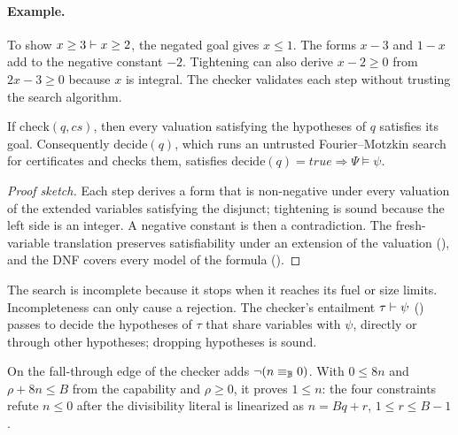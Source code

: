\paragraph{Example.} To show $x\ge3\vdash x\ge2$, the negated goal gives $x\le1$. The forms $x-3$ and $1-x$ add to the negative constant $-2$. Tightening can also derive $x-2\ge0$ from $2x-3\ge0$ because $x$ is integral. The checker validates each step without trusting the search algorithm.


\begin{claim}\label{thm:entail}
If $\mathrm{check}(q,\mathit{cs})$, then every valuation satisfying the hypotheses of $q$ satisfies its goal. Consequently $\mathrm{decide}(q)$, which runs an untrusted Fourier--Motzkin search for certificates and checks them, satisfies $\mathrm{decide}(q)=\mathit{true}\Rightarrow\Psi\models\psi$.
\end{claim}
\begin{proof}[Proof sketch]
Each step derives a form that is non-negative under every valuation of the extended variables satisfying the disjunct; tightening is sound because the left side is an integer. A negative constant is then a contradiction. The fresh-variable translation preserves satisfiability under an extension of the valuation (), and the DNF covers every model of the formula ().
\end{proof}

The search is incomplete because it stops when it reaches its fuel or size limits. Incompleteness can only cause a rejection. The checker's entailment $\tau\vdash\psi$ () passes to $\mathrm{decide}$ the hypotheses of $\tau$ that share variables with $\psi$, directly or through other hypotheses; dropping hypotheses is sound.

\begin{example}\label{ex:beq}
On the fall-through edge of  the checker adds $\lnot(n\equiv_{\mathbb{B}}0)$. With $0\le 8n$ and $\rho+8n\le B$ from the capability and $\rho\ge0$, it proves $1\le n$: the four constraints refute $n\le0$ after the divisibility literal is linearized as $n=Bq+r$, $1\le r\le B-1$.
\end{example}

